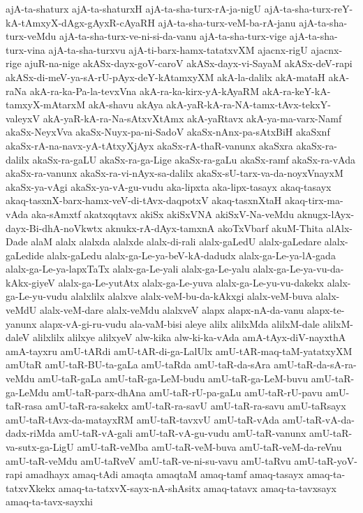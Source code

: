 {ajA-ta-shaturx
ajA-ta-shaturxH
ajA-ta-sha-turx-rA-ja-nigU
ajA-ta-sha-turx-reY-kA-tAmxyX-dAgx-gAyxR-cAyaRH
ajA-ta-sha-turx-veM-ba-rA-janu
ajA-ta-sha-turx-veMdu
ajA-ta-sha-turx-ve-ni-si-da-vanu
ajA-ta-sha-turx-vige
ajA-ta-sha-turx-vina
ajA-ta-sha-turxvu
ajA-ti-barx-hamx-tatatxvXM
ajacnx-rigU
ajacnx-rige
ajuR-na-nige
akASx-dayx-goV-caroV
akASx-dayx-vi-SayaM
akASx-deV-rapi
akASx-di-meV-ya-sA-rU-pAyx-deY-kAtamxyXM
akA-la-dalilx
akA-mataH
akA-raNa
akA-ra-ka-Pa-la-tevxVna
akA-ra-ka-kirx-yA-kAyaRM
akA-ra-keY-kA-tamxyX-mAtarxM
akA-shavu
akAya
akA-yaR-kA-ra-NA-tamx-tAvx-tekxY-valeyxV
akA-yaR-kA-ra-Na-sAtxvXtAmx
akA-yaRtavx
akA-ya-ma-varx-Namf
akaSx-NeyxVva
akaSx-Nuyx-pa-ni-SadoV
akaSx-nAnx-pa-sAtxBiH
akaSxnf
akaSx-rA-na-navx-yA-tAtxyXjAyx
akaSx-rA-thaR-vanunx
akaSxra
akaSx-ra-dalilx
akaSx-ra-gaLU
akaSx-ra-ga-Lige
akaSx-ra-gaLu
akaSx-ramf
akaSx-ra-vAda
akaSx-ra-vanunx
akaSx-ra-vi-nAyx-sa-dalilx
akaSx-sU-tarx-va-da-noyxVnayxM
akaSx-ya-vAgi
akaSx-ya-vA-gu-vudu
aka-lipxta
aka-lipx-tasayx
akaq-tasayx
akaq-tasxnX-barx-hamx-veV-di-tAvx-daqpotxV
akaq-tasxnXtaH
akaq-tirx-ma-vAda
aka-sAmxtf
akatxqqtavx
akiSx
akiSxVNA
akiSxV-Na-veMdu
aknugx-lAyx-dayx-Bi-dhA-noVkwtx
aknukx-rA-dAyx-tamxnA
akoTxVbarf
akuM-Thita
alAlx-Dade
alaM
alalx
alalxda
alalxde
alalx-di-rali
alalx-gaLedU
alalx-gaLedare
alalx-gaLedide
alalx-gaLedu
alalx-ga-Le-ya-beV-kA-dadudx
alalx-ga-Le-ya-lA-gada
alalx-ga-Le-ya-lapxTaTx
alalx-ga-Le-yali
alalx-ga-Le-yalu
alalx-ga-Le-ya-vu-da-kAkx-giyeV
alalx-ga-Le-yutAtx
alalx-ga-Le-yuva
alalx-ga-Le-yu-vu-dakekx
alalx-ga-Le-yu-vudu
alalxlilx
alalxve
alalx-veM-bu-da-kAkxgi
alalx-veM-buva
alalx-veMdU
alalx-veM-dare
alalx-veMdu
alalxveV
alapx
alapx-nA-da-vanu
alapx-te-yanunx
alapx-vA-gi-ru-vudu
ala-vaM-bisi
aleye
alilx
alilxMda
alilxM-dale
alilxM-daleV
alilxlilx
alilxye
alilxyeV
alw-kika
alw-ki-ka-vAda
amA-tAyx-diV-nayxthA
amA-tayxru
amU-tARdi
amU-tAR-di-ga-LalUlx
amU-tAR-maq-taM-yatatxyXM
amUtaR
amU-taR-BU-ta-gaLa
amU-taRda
amU-taR-da-sAra
amU-taR-da-sA-ra-veMdu
amU-taR-gaLa
amU-taR-ga-LeM-budu
amU-taR-ga-LeM-buvu
amU-taR-ga-LeMdu
amU-taR-parx-dhAna
amU-taR-rU-pa-gaLu
amU-taR-rU-pavu
amU-taR-rasa
amU-taR-ra-sakekx
amU-taR-ra-savU
amU-taR-ra-savu
amU-taRsayx
amU-taR-tAvx-da-matayxRM
amU-taR-tavxvU
amU-taR-vAda
amU-taR-vA-da-dadx-riMda
amU-taR-vA-gali
amU-taR-vA-gu-vudu
amU-taR-vanunx
amU-taR-va-sutx-ga-LigU
amU-taR-veMba
amU-taR-veM-buva
amU-taR-veM-da-reVnu
amU-taR-veMdu
amU-taRveV
amU-taR-ve-ni-su-vavu
amU-taRvu
amU-taR-yoV-rapi
amadhayx
amaq-tAdi
amaqta
amaqtaM
amaq-tamf
amaq-tasayx
amaq-ta-tatxvXkekx
amaq-ta-tatxvX-sayx-nA-shAsitx
amaq-tatavx
amaq-ta-tavxsayx
amaq-ta-tavx-sayxhi
}
